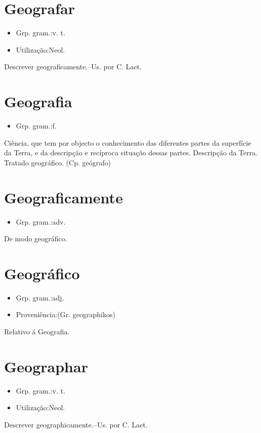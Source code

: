 \section{Geografar}
\begin{itemize}
\item {Grp. gram.:v. t.}
\end{itemize}
\begin{itemize}
\item {Utilização:Neol.}
\end{itemize}
Descrever geograficamente.--Us. por C. Laet.
\section{Geografia}
\begin{itemize}
\item {Grp. gram.:f.}
\end{itemize}
Ciência, que tem por objecto o conhecimento das diferentes partes da superfície da Terra, e da descripção e recíproca situação dessas partes.
Descripção da Terra.
Tratado geográfico.
(Cp. \textunderscore geógrafo\textunderscore )
\section{Geograficamente}
\begin{itemize}
\item {Grp. gram.:adv.}
\end{itemize}
De modo geográfico.
\section{Geográfico}
\begin{itemize}
\item {Grp. gram.:adj.}
\end{itemize}
\begin{itemize}
\item {Proveniência:(Gr. \textunderscore geographikos\textunderscore )}
\end{itemize}
Relativo á Geografia.
\section{Geographar}
\begin{itemize}
\item {Grp. gram.:v. t.}
\end{itemize}
\begin{itemize}
\item {Utilização:Neol.}
\end{itemize}
Descrever geographicamente.--Us. por C. Laet.
